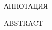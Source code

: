 


\begin{center}
	АННОТАЦИЯ
\end{center}

\begin{center}
	ABSTRACT
\end{center}

\tableofcontents




\printbibliography


